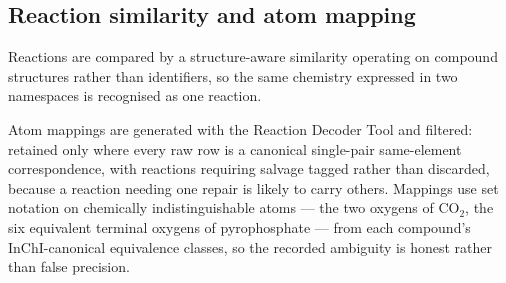 \subsection{Reaction similarity and atom mapping}\label{sec:methods-mapping}

Reactions are compared by a structure-aware similarity operating on compound
structures rather than identifiers, so the same chemistry expressed in two
namespaces is recognised as one reaction.

Atom mappings are generated with the Reaction Decoder Tool and filtered:
retained only where every raw row is a canonical single-pair same-element
correspondence, with reactions requiring salvage tagged rather than discarded,
because a reaction needing one repair is likely to carry others. Mappings use
set notation on chemically indistinguishable atoms --- the two oxygens of
CO$_2$, the six equivalent terminal oxygens of pyrophosphate --- from each
compound's InChI-canonical equivalence classes, so the recorded ambiguity is
honest rather than false precision.
